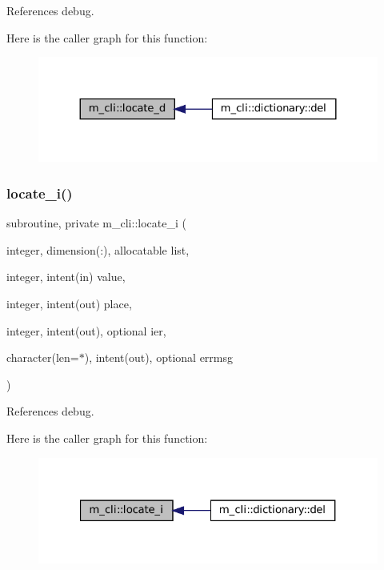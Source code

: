 References debug.

Here is the caller graph for this function\+:\nopagebreak
\begin{figure}[H]
\begin{center}
\leavevmode
\includegraphics[width=324pt]{namespacem__cli_a4187c24a2abf5cc630232965637493e8_icgraph}
\end{center}
\end{figure}
\mbox{\label{namespacem__cli_a36665ab0ea5080c14c8c9e52ed07d397}} 
\subsubsection{\texorpdfstring{locate\+\_\+i()}{locate\_i()}}
{\footnotesize\ttfamily subroutine, private m\+\_\+cli\+::locate\+\_\+i (\begin{DoxyParamCaption}\item[{integer, dimension(\+:), allocatable}]{list,  }\item[{integer, intent(in)}]{value,  }\item[{integer, intent(out)}]{place,  }\item[{integer, intent(out), optional}]{ier,  }\item[{character(len=$\ast$), intent(out), optional}]{errmsg }\end{DoxyParamCaption})\hspace{0.3cm}{\ttfamily [private]}}



References debug.

Here is the caller graph for this function\+:\nopagebreak
\begin{figure}[H]
\begin{center}
\leavevmode
\includegraphics[width=321pt]{namespacem__cli_a36665ab0ea5080c14c8c9e52ed07d397_icgraph}
\end{center}
\end{figure}
\mbox{\label{namespacem__cli_ac44389e115b536069f324bffea7d2469}} 
